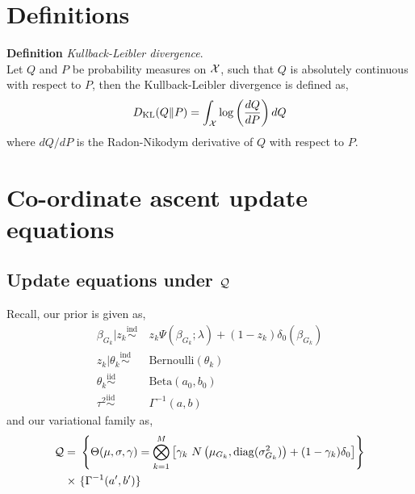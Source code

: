 \newpage
\appendix
{}

\section{Definitions}

\textbf{Definition} \textit{Kullback-Leibler divergence}.\\ Let $Q$ and $P$ be probability measures on $\mathcal{X}$, such that $ Q $ is absolutely continuous with respect to $P$, then the Kullback-Leibler divergence is defined as,
\begin{equation}\label{eq:kl}
D_\text{KL}(Q \| P) = \int_{\mathcal{X}} \log \left( \frac{dQ}{dP} \right) dQ
\end{equation}
where $dQ/dP$ is the Radon-Nikodym derivative of $Q$ with respect to $P$.


\section{Co-ordinate ascent update equations} \label{appendix:gsvb_derivations}

\subsection{Update equations under $\mathcal{Q}$}

Recall, our prior is given as,
\begin{equation}
\begin{aligned}
    \beta_{G_k} | z_k \overset{\text{ind}}{\sim} &\ z_k \Psi(\beta_{G_k}; \lambda) + (1-z_k) \delta_0(\beta_{G_k}) \\
    z_k | \theta_k \overset{\text{ind}}{\sim} &\ \text{Bernoulli}(\theta_k) \\
    \theta_k \overset{\text{iid}}{\sim} &\ \text{Beta}(a_0, b_0) \\
    \tau^2 \overset{\text{iid}}{\sim} &\ \Gamma^{-1}(a, b)
\end{aligned}
\end{equation}
and our variational family as,
\begin{equation}
\begin{aligned}
    \mathcal{Q} = &\
    \left\{ \Theta(\mu, \sigma, \gamma) = 
	\bigotimes_{k=1}^M 
	\left[ 
	    \gamma_k\ N\left(\mu_{G_k}, \operatorname{diag}(\sigma_{G_k}^2) \right) + 
	    (1-\gamma_k) \delta_0
	\right] 
    \right\} \\
    \times &\
    \{ \Gamma^{-1}(a', b') \}
\end{aligned}
\end{equation}

